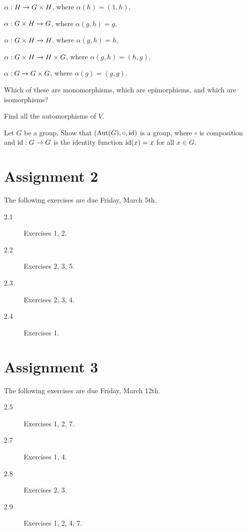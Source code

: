 \begin{exercises}
\begin{theoremenum}
      \item $\alpha: H \to G \times H$, where $\alpha(h) = (1,h)$,

      \item $\alpha: G \times H \to G$, where $\alpha(g,h) = g$,

      \item $\alpha: G \times H \to H$, where $\alpha(g,h) = h$,

      \item $\alpha: G \times H \to H \times G$, where 
        $\alpha(g,h) = (h,g)$,

      \item $\alpha: G \to G \times G$, where $\alpha(g) = (g,g)$.
    \end{theoremenum}
    Which of these are monomorphisms, which are epimorphisms, and 
    which are isomorphisms?
  
  \item Find all the automorphisms of $V$.
  
  \item Let $G$ be a group.  Show that $(\operatorname{Aut}(G), \circ, \text{id})$ is a 
    group, where $\circ$ is composition and $\text{id}: G \to G$ is the 
    identity function $\text{id}(x) = x$ for all $x \in G$.
\end{exercises}


\newpage
\section*{Assignment 2}

The following exercises are due Friday, March 5th.

\begin{description}
  \item[2.1] Exercises 1, 2.
  \item[2.2] Exercises 2, 3, 5.
  \item[2.3] Exercises 2, 3, 4.
  \item[2.4] Exercises 1.
\end{description}

\section*{Assignment 3}

The following exercises are due Friday, March 12th.

\begin{description}
  \item[2.5] Exercises 1, 2, 7.
  \item[2.7] Exercises 1, 4.
  \item[2.8] Exercises 2, 3.
  \item[2.9] Exercises 1, 2, 4, 7.
\end{description}
